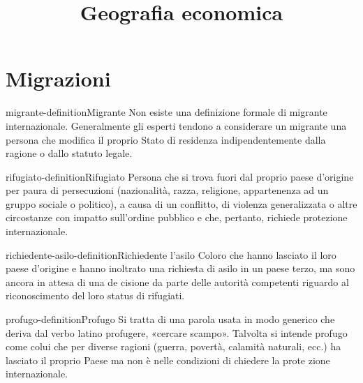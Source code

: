 \documentclass[preview]{standalone}
\begin{document}
\title{Geografia economica}
\genpage

\section{Migrazioni}

\begin{snippetdefinition}{migrante-definition}{Migrante}
    Non esiste una definizione formale di migrante internazionale. Generalmente gli esperti tendono a considerare un migrante una persona che
    modifica il proprio Stato di residenza indipendentemente dalla ragione
    o dallo statuto legale.
\end{snippetdefinition}

\begin{snippetdefinition}{rifugiato-definition}{Rifugiato}
    Persona che si trova fuori dal proprio paese d'origine per paura di persecuzioni
    (nazionalità, razza, religione, appartenenza ad un gruppo sociale o politico),
    a causa di un conflitto, di violenza generalizzata o altre
    circostanze con impatto sull'ordine pubblico e che, pertanto, richiede
    protezione internazionale.
\end{snippetdefinition}

\begin{snippetdefinition}{richiedente-asilo-definition}{Richiedente l'asilo}
    Coloro che hanno lasciato il loro paese d'origine e hanno inoltrato una
    richiesta di asilo in un paese terzo, ma sono ancora in attesa di una
    de cisione da parte delle autorità competenti riguardo al riconoscimento
    del loro status di rifugiati.
\end{snippetdefinition}

\begin{snippetdefinition}{profugo-definition}{Profugo}
    Si tratta di una parola usata in modo generico che deriva dal verbo latino
    profugere, «cercare scampo». Talvolta si intende profugo come
    colui che per diverse ragioni (guerra, povertà, calamità naturali, ecc.) ha
    lasciato il proprio Paese ma non è nelle condizioni di chiedere la prote zione internazionale.
\end{snippetdefinition}

\newcommand{\greenbox}{
    \fcolorbox{black}{green}{\rule{0pt}{5pt}\rule{5pt}{0pt}}
}

\newcommand{\redbox}{
    \fcolorbox{black}{red}{\rule{0pt}{5pt}\rule{5pt}{0pt}}
}
\end{document}
